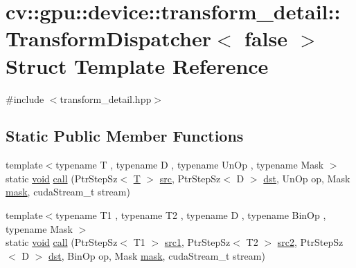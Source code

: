 \hypertarget{structcv_1_1gpu_1_1device_1_1transform__detail_1_1TransformDispatcher_3_01false_01_4}{\section{cv\-:\-:gpu\-:\-:device\-:\-:transform\-\_\-detail\-:\-:Transform\-Dispatcher$<$ false $>$ Struct Template Reference}
\label{structcv_1_1gpu_1_1device_1_1transform__detail_1_1TransformDispatcher_3_01false_01_4}
}


{\ttfamily \#include $<$transform\-\_\-detail.\-hpp$>$}

\subsection*{Static Public Member Functions}
\begin{DoxyCompactItemize}
\item 
{\footnotesize template$<$typename T , typename D , typename Un\-Op , typename Mask $>$ }\\static \hyperlink{legacy_8hpp_a8bb47f092d473522721002c86c13b94e}{void} \hyperlink{structcv_1_1gpu_1_1device_1_1transform__detail_1_1TransformDispatcher_3_01false_01_4_ab1950799fe044cafc58efc41c500c094}{call} (Ptr\-Step\-Sz$<$ \hyperlink{calib3d_8hpp_a3efb9551a871ddd0463079a808916717}{T} $>$ \hyperlink{legacy_8hpp_a371cd109b74033bc4366f584edd3dacc}{src}, Ptr\-Step\-Sz$<$ D $>$ \hyperlink{photo__c_8h_aed13e2a25279b24dc954073233fef7a5}{dst}, Un\-Op op, Mask \hyperlink{tracking_8hpp_a6b13ecd2fd6ec7ad422f1d7863c3ad19}{mask}, cuda\-Stream\-\_\-t stream)
\item 
{\footnotesize template$<$typename T1 , typename T2 , typename D , typename Bin\-Op , typename Mask $>$ }\\static \hyperlink{legacy_8hpp_a8bb47f092d473522721002c86c13b94e}{void} \hyperlink{structcv_1_1gpu_1_1device_1_1transform__detail_1_1TransformDispatcher_3_01false_01_4_a1fafc04949c24fa3f52cb61215d1e35d}{call} (Ptr\-Step\-Sz$<$ T1 $>$ \hyperlink{core__c_8h_a897de4702c922f4cccda0d57ccdcafb3}{src1}, Ptr\-Step\-Sz$<$ T2 $>$ \hyperlink{core__c_8h_a7561a36d48069d54a6c8ac4e4750edfd}{src2}, Ptr\-Step\-Sz$<$ D $>$ \hyperlink{photo__c_8h_aed13e2a25279b24dc954073233fef7a5}{dst}, Bin\-Op op, Mask \hyperlink{tracking_8hpp_a6b13ecd2fd6ec7ad422f1d7863c3ad19}{mask}, cuda\-Stream\-\_\-t stream)
\end{DoxyCompactItemize}


